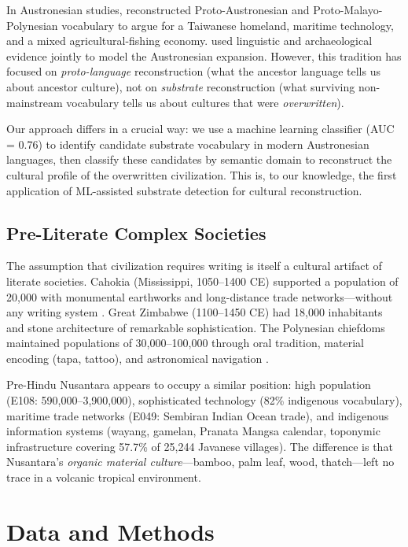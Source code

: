 \documentclass[12pt,a4paper]{article}
\begin{document}
In Austronesian studies, \citet{blust2009} reconstructed Proto-Austronesian and Proto-Malayo-Polynesian vocabulary to argue for a Taiwanese homeland, maritime technology, and a mixed agricultural-fishing economy. \citet{bellwood1995} used linguistic and archaeological evidence jointly to model the Austronesian expansion. However, this tradition has focused on \textit{proto-language} reconstruction (what the ancestor language tells us about ancestor culture), not on \textit{substrate} reconstruction (what surviving non-mainstream vocabulary tells us about cultures that were \textit{overwritten}).

Our approach differs in a crucial way: we use a machine learning classifier (AUC = 0.76) to identify candidate substrate vocabulary in modern Austronesian languages, then classify these candidates by semantic domain to reconstruct the cultural profile of the overwritten civilization. This is, to our knowledge, the first application of ML-assisted substrate detection for cultural reconstruction.

\subsection{Pre-Literate Complex Societies}

The assumption that civilization requires writing is itself a cultural artifact of literate societies. Cahokia (Mississippi, 1050--1400 CE) supported a population of 20,000 with monumental earthworks and long-distance trade networks---without any writing system \citep{pauketat2009}. Great Zimbabwe (1100--1450 CE) had 18,000 inhabitants and stone architecture of remarkable sophistication. The Polynesian chiefdoms maintained populations of 30,000--100,000 through oral tradition, material encoding (tapa, tattoo), and astronomical navigation \citep{kirch2000}.

Pre-Hindu Nusantara appears to occupy a similar position: high population (E108: 590,000--3,900,000), sophisticated technology (82\% indigenous vocabulary), maritime trade networks (E049: Sembiran Indian Ocean trade), and indigenous information systems (wayang, gamelan, Pranata Mangsa calendar, toponymic infrastructure covering 57.7\% of 25,244 Javanese villages). The difference is that Nusantara's \textit{organic material culture}---bamboo, palm leaf, wood, thatch---left no trace in a volcanic tropical environment.

\section{Data and Methods}
\end{document}
